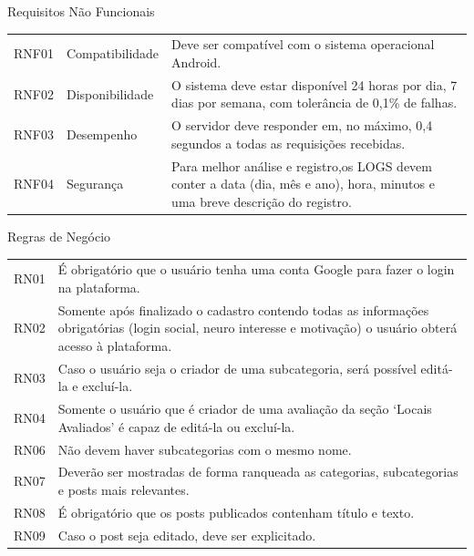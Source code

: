 \begin{quadro}[htb]
	\centering
	\ABNTEXfontereduzida
	\caption[Requisitos Não Funcionais]{Requisitos Não Funcionais}
	\label{requisitos-nao-funcionais}
	\begin{tabular}{|p{2.0cm}|p{6.5cm}|p{6.5cm}|}
		\hline
		\thead{Código} & \thead{Categoria}  & \thead{Requisito} \\
		\hline
		RNF01 & Compatibilidade &
		Deve ser compatível com o sistema operacional Android.\\
		\hline
		RNF02 & Disponibilidade & O sistema deve estar disponível 24 horas por dia, 7 dias por semana, com tolerância de 0,1\% de falhas. \\
		\hline
		RNF03 & Desempenho & O servidor deve responder em, no máximo, 0,4 segundos a todas as requisições recebidas. \\
		\hline
		RNF04 & Segurança & Para melhor análise e registro,os LOGS devem conter a data (dia, mês e ano), hora, minutos e uma breve descrição do registro.\\
		\hline
	\end{tabular}
	\fonte{Equipe diversaGente (2022)}
\end{quadro}



\begin{quadro}[htb]
	\centering
	\ABNTEXfontereduzida
	\caption[Regras de Negócio]{Regras de Negócio}
	\label{regra-negocio}
	\begin{tabular}{|p{3.3cm}|p{10.3cm}|}
		\hline
		\thead{Código} & \thead{Regra de negócio} \\
		\hline
		RN01 & É obrigatório que o usuário tenha uma conta Google para fazer o login na plataforma. \\
		\hline
		RN02 & Somente após finalizado o cadastro contendo todas as informações obrigatórias (login social, neuro interesse e motivação) o usuário obterá acesso à plataforma.\\
		\hline
		RN03 & Caso o usuário seja o criador de uma subcategoria, será possível editá-la e excluí-la.  \\
		\hline
		RN04 & Somente o usuário que é criador de uma avaliação da seção ‘Locais Avaliados’ é capaz de editá-la ou excluí-la. \\
		\hline
		RN06 & Não devem haver subcategorias com o mesmo nome. \\
		\hline
		RN07 & Deverão ser mostradas de forma ranqueada as categorias, subcategorias e posts mais relevantes.\\
		\hline
		RN08 & É obrigatório que os posts publicados contenham título e texto.\\
		\hline
		RN09 & Caso o post seja editado, deve ser explicitado.\\
		\hline
	\end{tabular}
\end{quadro}\pagebreak



